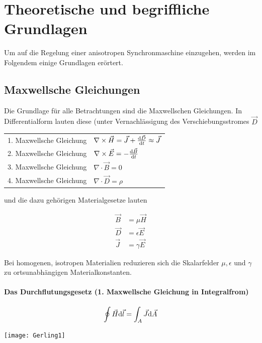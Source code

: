 
\chapter{Theoretische und begriffliche Grundlagen}\label{cha:grundlagen}

Um auf die Regelung einer anisotropen Synchronmaschine einzugehen, werden im Folgendem einige Grundlagen erörtert.

\section{Maxwellsche Gleichungen}\label{sec:maxwell}

Die Grundlage für alle Betrachtungen sind die Maxwellschen Gleichungen.
In Differentialform lauten diese (unter Vernachlässigung des Verschiebungsstromes $\vec{D}$

\begin{tabular}{ll}
1. Maxwellsche Gleichung	&	$\nabla \times \vec{H} = \vec{J}+\frac{\mathrm{d}\vec{D}}{\mathrm{d}t} \approx \vec{J}$ \\
2. Maxwellsche Gleichung	&	$\nabla \times \vec{E} = -\frac{\mathrm{d}\vec{B}}{\mathrm{d}t}$ \\
3. Maxwellsche Gleichung	&	$\nabla \cdot \vec{B} = 0$ \\
4. Maxwellsche Gleichung	&	$\nabla \cdot \vec{D} = \rho$
\end{tabular}

und die dazu gehörigen Materialgesetze lauten

\begin{align*}
\vec{B} &= \mu\vec{H}\\
\vec{D}	&= \epsilon\vec{E}\\
\vec{J} &= \gamma\vec{E}
\end{align*}

Bei homogenen, isotropen Materialien reduzieren sich die Skalarfelder $\mu, \epsilon$ und $\gamma$ zu ortsunabhängigen Materialkonstanten.

\subsubsection{Das Durchflutungsgesetz (1. Maxwellsche Gleichung in Integralfrom)}

\begin{minipage}{0.5\textwidth}
	\begin{align}
		\oint \vec{H}\mathrm{d}\vec{l} = \int_A \vec{J}\mathrm{d}\vec{A}
	\end{align}
\end{minipage}
\begin{minipage}{0.5\textwidth}
	\texttt{[image: Gerling1]}
\end{minipage}

